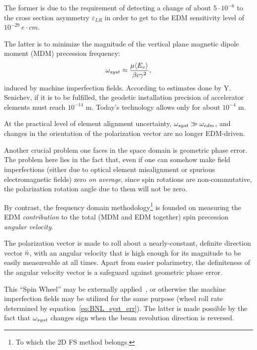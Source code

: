 The former is due to the requirement of detecting a change of about $5\cdot 10^{-6}$ to the
cross section asymmetry $\varepsilon_{LR}$ in order to get to the EDM sensitivity level
of $10^{-29}~e\cdot cm$.~\cite[p.~18]{BNL:Deuteron2008}

The latter is to minimize the magnitude of the vertical plane magnetic dipole 
moment (MDM) precession frequency:~\cite[p.~11]{BNL:Deuteron2008}
\begin{equation}\label{eq:BNL_syst_err}
\w_{syst} \approx \frac{\mu\avg{E_v}}{\beta c\gamma^2},
\end{equation}
induced by machine imperfection fields. According to estimates done by Y. Senichev, if it is to be fulfilled,
the geodetic installation precision of accelerator elements must reach $10^{-14}$ m. Today's technology
allows only for about $10^{-4}$ m.

At the practical level of element alignment uncertainty, $\omega_{syst} \gg \omega_{edm}$,
and changes in the orientation of the polarization vector are no longer EDM-driven.

Another crucial problem one faces in the space domain is geometric phase error.~\cite[p.~6]{BNL:Proton}
The problem here lies in the fact that, even if one can somehow make field imperfections (either due to
optical element misalignment or spurious electromagnetic fields) zero
\emph{on average}, since spin rotations are non-commutative, the polarization rotation angle due to them
will not be zero.

By contrast, the frequency domain methodology\footnote{To which the 2D FS method belongs.} is founded on
measuring the EDM \emph{contribution} to the total (MDM and EDM together) spin precession \emph{angular velocity}.

The polarization vector is made to roll about a nearly-constant, definite direction vector $\bar n$,
with an angular velocity that is high enough for its magnitude to be easily measureable at all times.
Apart from easier polarimetry, the definiteness of the angular velocity vector is a safeguard against geometric
phase error.

This ``Spin Wheel'' may be externally applied~\cite{Koop:SpinWheel}, or otherwise the machine imperfection fields
may be utilized for the same purpose (wheel roll rate determined by equation~\eqref{eq:BNL_syst_err}).
The latter is made possible by the fact that $\omega_{syst}$ changes sign when the beam revolution direction
is reversed.~\cite[p.~11]{BNL:Deuteron2008}

